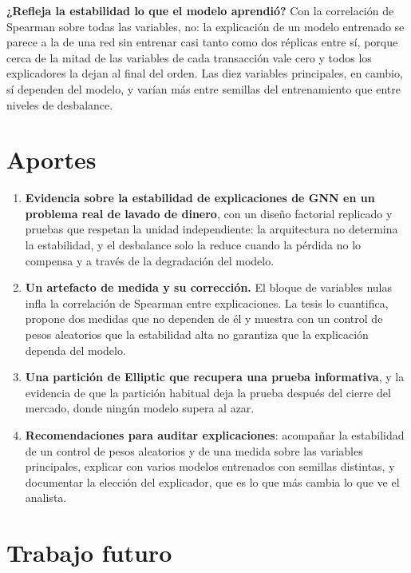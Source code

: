 \textbf{¿Refleja la estabilidad lo que el modelo aprendió?} Con la correlación de Spearman sobre
todas las variables, no: la explicación de un modelo entrenado se parece a la de una red sin
entrenar casi tanto como dos réplicas entre sí, porque cerca de la mitad de las variables de
cada transacción vale cero y todos los explicadores la dejan al final del orden. Las diez
variables principales, en cambio, sí dependen del modelo, y varían más entre semillas del
entrenamiento que entre niveles de desbalance.

\section{Aportes}

\begin{enumerate}
  \item \textbf{Evidencia sobre la estabilidad de explicaciones de GNN en un problema real de
        lavado de dinero}, con un diseño factorial replicado y pruebas que respetan la unidad
        independiente: la arquitectura no determina la estabilidad, y el desbalance solo la
        reduce cuando la pérdida no lo compensa y a través de la degradación del modelo.
  \item \textbf{Un artefacto de medida y su corrección.} El bloque de variables nulas infla la
        correlación de Spearman entre explicaciones. La tesis lo cuantifica, propone dos medidas
        que no dependen de él y muestra con un control de pesos aleatorios que la estabilidad
        alta no garantiza que la explicación dependa del modelo.
  \item \textbf{Una partición de Elliptic que recupera una prueba informativa}, y la evidencia de
        que la partición habitual deja la prueba después del cierre del mercado, donde ningún
        modelo supera al azar.
  \item \textbf{Recomendaciones para auditar explicaciones}: acompañar la estabilidad de un
        control de pesos aleatorios y de una medida sobre las variables principales, explicar
        con varios modelos entrenados con semillas distintas, y documentar la elección del
        explicador, que es lo que más cambia lo que ve el analista.
\end{enumerate}

\section{Trabajo futuro}


